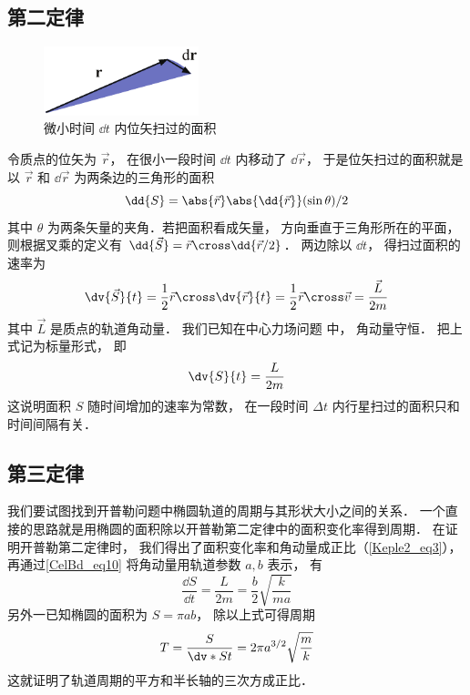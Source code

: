 

\subsection{第二定律}
\begin{figure}[ht]
\centering
\includegraphics[width=4.5cm]{./figures/Keple21.pdf}
\caption{微小时间 $\dd{t}$ 内位矢扫过的面积} \label{Keple2_fig1}
\end{figure}

令质点的位矢为 $\vec r$，  在很小一段时间 $\dd{t}$ 内移动了 $\dd{\vec r}$，  于是位矢扫过的面积就是以 $\vec r$ 和 $\dd{\vec r}$ 为两条边的三角形的面积
\begin{equation}
\dd{S} = \abs{\vec r} \abs{\dd{\vec r}} (\sin \theta) /2
\end{equation}
其中 $\theta$ 为两条矢量的夹角．若把面积看成矢量， 方向垂直于三角形所在的平面， 则根据叉乘的定义有 $\dd{\vec S} = \vec r \cross \dd{\vec r/2}$． 两边除以 $\dd{t}$，  得扫过面积的速率为
\begin{equation}
\dv{\vec S}{t} = \frac12 \vec r \cross \dv{\vec r}{t} = \frac12 \vec r\cross \vec v = \frac{\vec L}{2m}
\end{equation}
其中 $\vec L$ 是质点的轨道角动量． 我们已知在中心力场问题 中， 角动量守恒． 把上式记为标量形式， 即
\begin{equation}\label{Keple2_eq3}
\dv{S}{t} = \frac{L}{2m}
\end{equation}
这说明面积 $S$ 随时间增加的速率为常数， 在一段时间 $\Delta t$ 内行星扫过的面积只和时间间隔有关．

\subsection{第三定律}
我们要试图找到开普勒问题中椭圆轨道的周期与其形状大小之间的关系． 一个直接的思路就是用椭圆的面积除以开普勒第二定律中的面积变化率得到周期． 在证明开普勒第二定律时， 我们得出了面积变化率和角动量成正比（\autoref{Keple2_eq3}）， 再通过\autoref{CelBd_eq10} 将角动量用轨道参数 $a,b$ 表示， 有
\begin{equation}
\frac{\dd{S}}{\dd{t}} = \frac{L}{2m} = \frac b2 \sqrt{\frac{k}{ma}}
\end{equation}
另外一已知椭圆的面积为 $S = \pi ab$， 除以上式可得周期
\begin{equation}
T = \frac{S}{\dv*{S}{t}} = 2\pi a^{3/2} \sqrt{\frac mk}
\end{equation}
这就证明了轨道周期的平方和半长轴的三次方成正比．